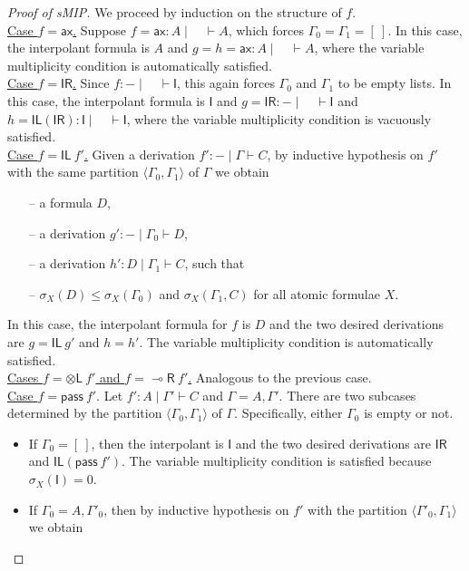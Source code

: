 \documentclass[sn-mathphys-num]{sn-jnl}%
\newcommand{\GG}{\Gamma}
\newcommand{\vd}{\vdash}
\newcommand{\tl}{\otimes \mathsf{L}}
\newcommand{\pass}{\mathsf{pass}}
\newcommand{\unitl}{\mathsf{IL}}
\newcommand{\unitr}{\mathsf{IR}}
\newcommand{\ax}{\mathsf{ax}}
\newcommand{\lolli}{\multimap}
\newcommand{\lright}{{\lolli}\mathsf{R}}
\newcommand{\unit}{\mathsf{I}}
\newcommand{\gs}[1]{\sigma_{X} (#1)}
\newcommand{\sMIP}{\textsf{sMIP}}
\theoremstyle{thmstyleone}%
\theoremstyle{thmstyletwo}%
\theoremstyle{thmstylethree}%
\begin{document}
\begin{proof}[Proof of \sMIP]
  We proceed by induction on the structure of $f$. 
  \\
  \underline{Case $f = \ax$.} Suppose $f = \ax : A \mid \quad \vd A$, which forces $\GG_0 = \GG_1 = [\ ]$.
  In this case, the interpolant formula is $A$ and $g = h = \ax : A \mid \quad \vd A$, where the variable multiplicity condition is automatically satisfied.
  \\
  \underline{Case $f = \unitr$.} Since $f : {-} \mid \quad \vd \unit$, this again forces $\GG_0$ and $\GG_1$ to be empty lists.
  In this case, the interpolant formula is $\unit$ and $g =  \unitr : {-} \mid \quad \vd \unit$ and $h = \unitl (\unitr) : \unit \mid \quad \vd \unit$, where the variable multiplicity condition is vacuously satisfied.
  \\
  \underline{Case $f = \unitl \ f'$.}
  Given a derivation $f' : {-} \mid \GG \vd C$, by inductive hypothesis on $f'$ with the same partition $\langle \GG_0, \GG_1 \rangle$ of $\GG$ we obtain  
  \begin{itemize}
    \item[--] a formula $D$,
    \item[--] a derivation $g' : {-} \mid \GG_0 \vd D$,
    \item[--] a derivation $h' : D \mid \GG_1 \vd C$, such that
    \item[--] $\gs{D} \leq \gs{\GG_0}$ and $\gs{\GG_1 , C}$ for all atomic formulae $X$.
  \end{itemize}
  In this case, the interpolant formula for $f$ is $D$ and the two desired derivations are $g = \unitl \ g'$ and $h = h'$.
  The variable multiplicity condition is automatically satisfied.
  \\
  \underline{Cases $f = \tl \ f'$ and $f = \lright \ f'$.} Analogous to the previous case.
  \\
  \underline{Case $f = \pass \ f'$}. Let $f' : A \mid \GG' \vd C$ and $\GG = A,\GG'$.
  There are two subcases determined by the partition $\langle \GG_0,\GG_1 \rangle$ of $\GG$. 
  Specifically, either $\GG_0$ is empty or not.
  \begin{itemize}
    \item If $\GG_0 = [\ ]$, then the interpolant is $\unit$ and the two desired derivations are $\unitr$ and $\unitl (\pass \ f')$.
    The variable multiplicity condition is satisfied because $\gs{\unit} = 0$.
    \item If $\GG_0 = A, \GG'_0$, then by inductive hypothesis on $f'$ with the partition $\langle \GG'_0, \GG_1 \rangle$ we obtain

\end{itemize}
\end{proof}
\end{document}
